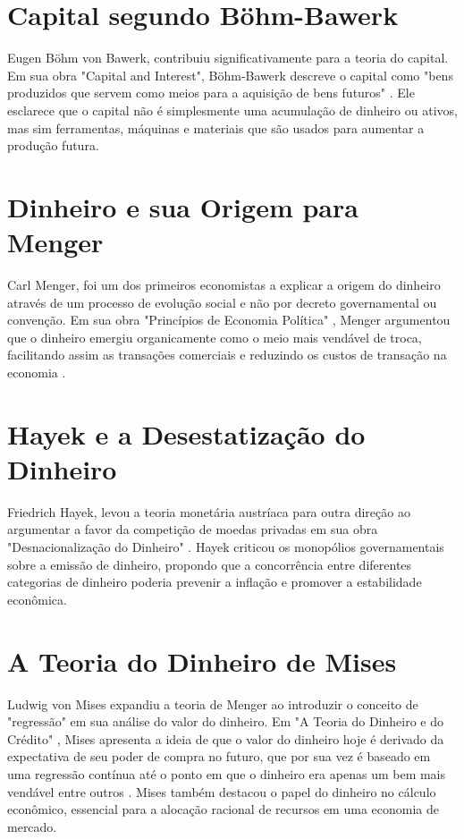 \section*{Capital segundo Böhm-Bawerk}
Eugen Böhm von Bawerk, contribuiu significativamente para a teoria do capital. Em sua obra "Capital and Interest"\cite{bohm1884capital}, Böhm-Bawerk descreve o capital como "bens produzidos que servem como meios para a aquisição de bens futuros" \cite{bohm1884capital}. Ele esclarece que o capital não é simplesmente uma acumulação de dinheiro ou ativos, mas sim ferramentas, máquinas e materiais que são usados para aumentar a produção futura.

\section*{Dinheiro e sua Origem para Menger}
Carl Menger, foi um dos primeiros economistas a explicar a origem do dinheiro através de um processo de evolução social e não por decreto governamental ou convenção. Em sua obra "Princípios de Economia Política" \cite{menger2017liberalismo}, Menger argumentou que o dinheiro emergiu organicamente como o meio mais vendável de troca, facilitando assim as transações comerciais e reduzindo os custos de transação na economia \cite{menger1871principles}.

\section*{Hayek e a Desestatização do Dinheiro}
Friedrich Hayek, levou a teoria monetária austríaca para outra direção ao argumentar a favor da competição de moedas privadas em sua obra "Desnacionalização do Dinheiro" \cite{hayek2017desestatizaccao}. Hayek criticou os monopólios governamentais sobre a emissão de dinheiro, propondo que a concorrência entre diferentes categorias de dinheiro poderia prevenir a inflação e promover a estabilidade econômica.

\section*{A Teoria do Dinheiro de Mises}
Ludwig von Mises expandiu a teoria de Menger ao introduzir o conceito de "regressão" em sua análise do valor do dinheiro. Em "A Teoria do Dinheiro e do Crédito" \cite{von2013theory}, Mises apresenta a ideia de que o valor do dinheiro hoje é derivado da expectativa de seu poder de compra no futuro, que por sua vez é baseado em uma regressão contínua até o ponto em que o dinheiro era apenas um bem mais vendável entre outros \cite{von2013theory}. Mises também destacou o papel do dinheiro no cálculo econômico, essencial para a alocação racional de recursos em uma economia de mercado.

